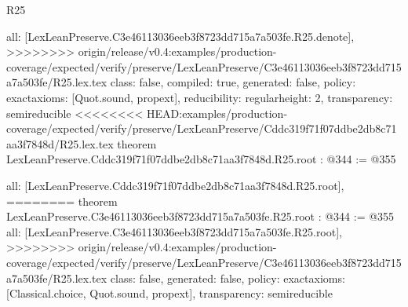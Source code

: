 \begin{lexlean}{R25}
\begin{coremodule}
{{{{{  all: [LexLeanPreserve.C3e46113036eeb3f8723dd715a7a503fe.R25.denote],
>>>>>>>> origin/release/v0.4:examples/production-coverage/expected/verify/preserve/LexLeanPreserve/C3e46113036eeb3f8723dd715a7a503fe/R25.lex.tex
  class: false,
  compiled: true,
  generated: false,
  policy: exact{axioms: [Quot.sound, propext]},
  reducibility: regular{height: 2},
  transparency: semireducible
}
<<<<<<<< HEAD:examples/production-coverage/expected/verify/preserve/LexLeanPreserve/Cddc319f71f07ddbe2db8c71aa3f7848d/R25.lex.tex
theorem LexLeanPreserve.Cddc319f71f07ddbe2db8c71aa3f7848d.R25.root : @344 := @355 {
  all: [LexLeanPreserve.Cddc319f71f07ddbe2db8c71aa3f7848d.R25.root],
========
theorem LexLeanPreserve.C3e46113036eeb3f8723dd715a7a503fe.R25.root : @344 := @355 {
  all: [LexLeanPreserve.C3e46113036eeb3f8723dd715a7a503fe.R25.root],
>>>>>>>> origin/release/v0.4:examples/production-coverage/expected/verify/preserve/LexLeanPreserve/C3e46113036eeb3f8723dd715a7a503fe/R25.lex.tex
  class: false,
  generated: false,
  policy: exact{axioms: [Classical.choice, Quot.sound, propext]},
  transparency: semireducible
}

}}}}}
\end{coremodule}
\end{lexlean}

